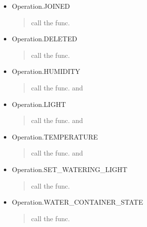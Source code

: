 \documentclass[letterpaper,10pt,english]{sphinxmanual}
\begin{document}
\begin{fulllineitems}
\begin{itemize}
\begin{quote}
call the func. 
\end{quote}

\item {} 
Operation.JOINED
\begin{quote}

call the func. 
\end{quote}

\item {} 
Operation.DELETED
\begin{quote}

call the func. 
\end{quote}

\item {} 
Operation.HUMIDITY
\begin{quote}

call the func.  and 
\end{quote}

\item {} 
Operation.LIGHT
\begin{quote}

call the func.  and 
\end{quote}

\item {} 
Operation.TEMPERATURE
\begin{quote}

call the func.  and 
\end{quote}

\item {} 
Operation.SET\_WATERING\_LIGHT
\begin{quote}

call the func. 
\end{quote}

\item {} 
Operation.WATER\_CONTAINER\_STATE
\begin{quote}

call the func. 
\end{quote}


\end{itemize}
\end{fulllineitems}
\end{document}
